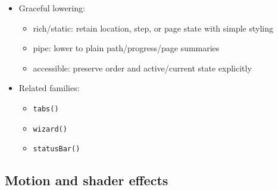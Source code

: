 \begin{itemize}
  \begin{itemize}
  \tightlist
  \item
    core
  \end{itemize}
\item
  Graceful lowering:

  \begin{itemize}
  \tightlist
  \item
    rich/static: retain location, step, or page state with simple styling
  \item
    pipe: lower to plain path/progress/page summaries
  \item
    accessible: preserve order and active/current state explicitly
  \end{itemize}
\item
  Related families:

  \begin{itemize}
  \tightlist
  \item
    \texttt{t\allowbreak{}a\allowbreak{}b\allowbreak{}s\allowbreak{}(\allowbreak{})}
  \item
    \texttt{w\allowbreak{}i\allowbreak{}z\allowbreak{}a\allowbreak{}r\allowbreak{}d\allowbreak{}(\allowbreak{})}
  \item
    \texttt{s\allowbreak{}t\allowbreak{}a\allowbreak{}t\allowbreak{}u\allowbreak{}s\allowbreak{}B\allowbreak{}a\allowbreak{}r\allowbreak{}(\allowbreak{})}
  \end{itemize}
\end{itemize}

\subsection{Motion and shader effects}\label{record-019-motion-and-shader-effects}

